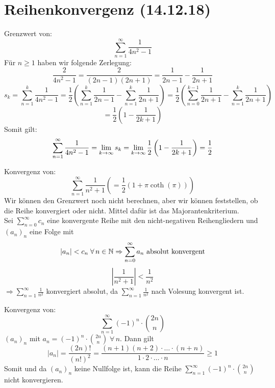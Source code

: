 \documentclass[../ana1u.tex]{subfiles}
\begin{document}
\setcounter{section}{7}

\section{Reihenkonvergenz (14.12.18)}
\begin{bsp}
    Grenzwert von:
    \[\sum_{n=1}^{\infty} \frac{1}{4n^2 - 1}\]
    Für \(n \geq 1\) haben wir folgende Zerlegung:
    \[\frac{2}{4n^2 - 1} = \frac{2}{(2n - 1)(2n + 1)} = \frac{1}{2n-1} - \frac{1}{2n+1}\]
    \[s_k = \sum_{n=1}^{k} \frac{1}{4n^2-1} = \frac{1}{2}\left(\sum_{n=1}^{k} \frac{1}{2n-1} - \sum_{n=1}^{k} \frac{1}{2n+1} \right) = \frac{1}{2}\left(\sum_{n=0}^{k-1} \frac{1}{2n+1} - \sum_{n=1}^{k} \frac{1}{2n+1} \right)\]
    \[= \frac{1}{2}\left(1 - \frac{1}{2k+1}\right)\]
    Somit gilt:
    \[\sum_{n=1}^{\infty} \frac{1}{4n^2 - 1} = \lim\limits_{k\rightarrow\infty} s_k = \lim\limits_{k\rightarrow\infty} \frac{1}{2}\left(1 - \frac{1}{2k+1}\right) = \frac{1}{2} \]
\end{bsp}
\begin{bsp}
    Konvergenz von:
    \[\sum_{n=1}^{\infty} \frac{1}{n^2+1} \left(= \frac{1}{2}(1 + \pi \coth(\pi)) \right)\]
    Wir können den Grenzwert noch nicht berechnen, aber wir können feststellen, ob die Reihe konvergiert oder nicht. Mittel dafür ist das Majorantenkriterium.\\
    Sei \(\sum_{n=0}^{\infty}c_n \) eine konvergente Reihe mit den nicht-negativen Reihengliedern und \((a_n)_n\) eine Folge mit
    \[|a_n| < c_n \; \forall \, n \in \mathbb{N} \Rightarrow \sum_{n=0}^{\infty} a_n \text{ absolut konvergent}\]
    \[\left|\frac{1}{n^2+1}\right| < \frac{1}{n^2}\]
    \(\Rightarrow \sum_{n=1}^{\infty} \frac{1}{n^2}\) konvergiert absolut, da \(\sum_{n=1}^{\infty} \frac{1}{n^2}\) nach Volesung konvergent ist.
\end{bsp}
\begin{bsp}
    Konvergenz von:\[\sum_{n=1}^{\infty} (-1)^n \cdot \binom{2n}{n}\]
    \((a_n)_n\) mit \(a_n = (-1)^n \cdot \binom{2n}{n} \; \forall \, n\). Dann gilt
    \[|a_n| = \frac{(2n)!}{(n!)^2} = \frac{(n+1)(n+2) \cdot \hdots \cdot (n+n)}{1 \cdot 2 \cdot \hdots \cdot n} \geq 1\]
    Somit und da \((a_n)_n\) keine Nullfolge ist, kann die Reihe \(\sum_{n=1}^{\infty} (-1)^n \cdot \binom{2n}{n}\) nicht konvergieren.
\end{bsp}
\end{document}

